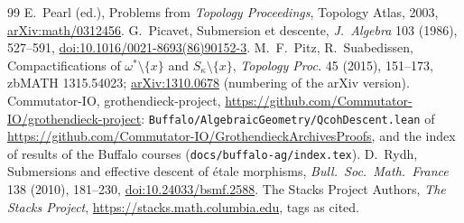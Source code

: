 \documentclass[11pt,a4paper]{amsart}
\theoremstyle{definition}
\theoremstyle{remark}
\begin{document}
\begin{thebibliography}{99}
 E.~Pearl (ed.), Problems from \emph{Topology Proceedings}, Topology Atlas, 2003, \href{https://arxiv.org/abs/math/0312456}{arXiv:math/0312456}.
 G.~Picavet, Submersion et descente, \emph{J.\ Algebra} 103 (1986), 527--591, \href{https://doi.org/10.1016/0021-8693(86)90152-3}{doi:10.1016/0021-8693(86)90152-3}.
 M.~F.~Pitz, R.~Suabedissen, Compactifications of $\omega^*\setminus\{x\}$ and $S_\kappa\setminus\{x\}$, \emph{Topology Proc.} 45 (2015), 151--173, zbMATH 1315.54023; \href{https://arxiv.org/abs/1310.0678}{arXiv:1310.0678} (numbering of the arXiv version).
 Commutator-IO, grothendieck-project, \url{https://github.com/Commutator-IO/grothendieck-project}: \texttt{Buffalo/AlgebraicGeometry/QcohDescent.lean} of \url{https://github.com/Commutator-IO/GrothendieckArchivesProofs}, and the index of results of the Buffalo courses (\texttt{docs/buffalo-ag/index.tex}).
 D.~Rydh, Submersions and effective descent of étale morphisms, \emph{Bull.\ Soc.\ Math.\ France} 138 (2010), 181--230, \href{https://doi.org/10.24033/bsmf.2588}{doi:10.24033/bsmf.2588}.
 The Stacks Project Authors, \emph{The Stacks Project}, \url{https://stacks.math.columbia.edu}, tags as cited.
\end{thebibliography}
\end{document}

